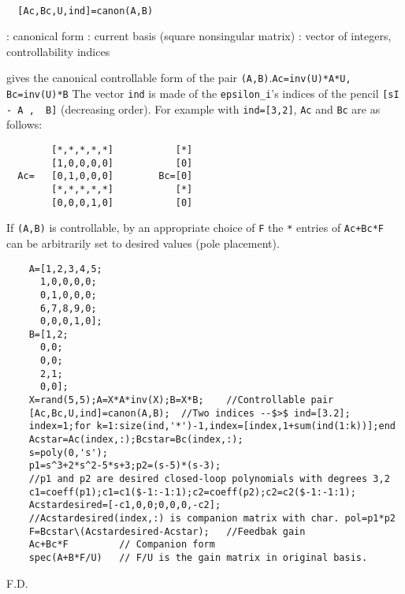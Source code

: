 \begin{mandesc}
   \\ %
\end{mandesc}
\begin{calling_sequence}
\begin{verbatim}
  [Ac,Bc,U,ind]=canon(A,B)    
\end{verbatim}
\end{calling_sequence}
\begin{parameters}
  \begin{varlist}
    : canonical form
    : current basis (square nonsingular matrix)
    : vector of integers, controllability indices
  \end{varlist}
\end{parameters}
\begin{mandescription}
  gives the canonical controllable form of the pair \verb!(A,B)!.\verb!Ac=inv(U)*A*U, Bc=inv(U)*B!
  The vector \verb!ind! is made of the \verb!epsilon_i!'s indices
  of the pencil \verb![sI - A ,  B]! (decreasing order).
  For example with \verb!ind=[3,2]!, \verb!Ac! and \verb!Bc! are as follows:
\begin{verbatim}
        [*,*,*,*,*]           [*]
        [1,0,0,0,0]           [0]
  Ac=   [0,1,0,0,0]        Bc=[0]
        [*,*,*,*,*]           [*]
        [0,0,0,1,0]           [0]
\end{verbatim}
  If \verb!(A,B)! is controllable, by an appropriate choice 
  of \verb!F! the \verb!*! entries of \verb!Ac+Bc*F! 
  can be arbitrarily set to desired values (pole placement).
\end{mandescription}
\begin{examples}
  \begin{Verbatim}
    A=[1,2,3,4,5;
      1,0,0,0,0;
      0,1,0,0,0;
      6,7,8,9,0;
      0,0,0,1,0];
    B=[1,2;
      0,0;
      0,0;
      2,1;
      0,0];
    X=rand(5,5);A=X*A*inv(X);B=X*B;    //Controllable pair 
    [Ac,Bc,U,ind]=canon(A,B);  //Two indices --$>$ ind=[3.2];
    index=1;for k=1:size(ind,'*')-1,index=[index,1+sum(ind(1:k))];end
    Acstar=Ac(index,:);Bcstar=Bc(index,:);
    s=poly(0,'s');
    p1=s^3+2*s^2-5*s+3;p2=(s-5)*(s-3);   
    //p1 and p2 are desired closed-loop polynomials with degrees 3,2
    c1=coeff(p1);c1=c1($-1:-1:1);c2=coeff(p2);c2=c2($-1:-1:1);
    Acstardesired=[-c1,0,0;0,0,0,-c2];  
    //Acstardesired(index,:) is companion matrix with char. pol=p1*p2
    F=Bcstar\(Acstardesired-Acstar);   //Feedbak gain
    Ac+Bc*F         // Companion form 
    spec(A+B*F/U)   // F/U is the gain matrix in original basis.
  \end{Verbatim}
\end{examples}
\begin{manseealso}
          
\end{manseealso}
\begin{authors}
  F.D.  
\end{authors}
